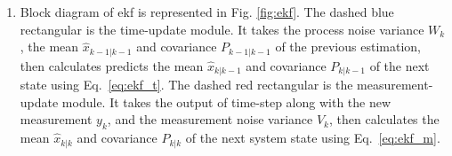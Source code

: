 \documentclass[12pt]{article}
\begin{document}
\begin{enumerate}[label=\arabic*)]
        Higher order \acrshort{ekf} is defined based on second order Taylor expansion using Jacobian and Hessian matrices. \acrshort{ekf} analysis here are based on \eqref{eq:ekf_t} and \eqref{eq:ekf_m}.
        
    \item
    
        Block diagram of \acrshort{ekf} is represented in Fig. \ref{fig:ekf}. The dashed blue rectangular is the time-update module. It takes the process noise variance $W_k$, the mean $\hat{x}_{k-1|k-1}$ and covariance $P_{k-1|k-1}$ of the previous estimation, then calculates predicts the mean $\hat{x}_{k|k-1}$ and covariance $P_{k|k-1}$ of the next state using Eq.~\eqref{eq:ekf_t}.  The dashed red rectangular is the measurement-update module. It takes the output of time-step along with the new measurement $y_k$, and the measurement noise variance $V_k$, then calculates the mean $\hat{x}_{k|k}$ and covariance $P_{k|k}$ of the next system state using Eq.~\eqref{eq:ekf_m}.  
    

\end{enumerate}
\end{document}
